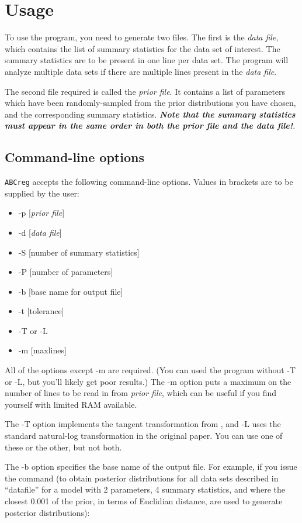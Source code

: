 \documentclass{article}
\begin{document}
\section*{Usage}
To use the program, you need to generate two files.  The first is the \textit{data file}, which contains the list of summary statistics for the data set of interest.  The summary statistics are to be present in one line per data set.  The program will analyze multiple data sets if there are multiple lines present in the \textit{data file}.

The second file required is called the \textit{prior file}.  It contains a list of parameters which have been randomly-sampled from the prior distributions you have chosen, and the corresponding summary statistics.  \textit{\textbf{Note that the summary statistics must appear in the same order in both the prior file and the data file!}}.

\subsection*{Command-line options}
\texttt{ABCreg} accepts the following command-line options.  Values in brackets are to be supplied by the user:
\begin{itemize}
\item -p [\textit{prior file}]
\item -d [\textit{data file}]
\item -S [number of summary statistics]
\item -P [number of parameters]
\item -b [base name for output file]
\item -t [tolerance]
\item -T or -L
\item -m [maxlines] 
\end{itemize}

All of the options except -m are required.  (You can used the program without -T or -L, but you'll likely get poor results.)  The -m option puts a maximum on the number of lines to be read in from \textit{prior file}, which can be useful if you find yourself with limited RAM available.

The -T option implements the tangent transformation from \cite{hamilton.abc.2005}, and -L uses the standard natural-log transformation in the original \cite{beaumont02ABC} paper.  You can use one of these or the other, but not both.

The -b option specifies the base name of the output file.  For example, if you issue the command (to obtain posterior distributions for all data sets described in ``datafile'' for a model with 2 parameters, 4 summary statistics, and where the closest 0.001 of the prior, in terms of Euclidian distance, are used to generate posterior distributions):
\end{document}

